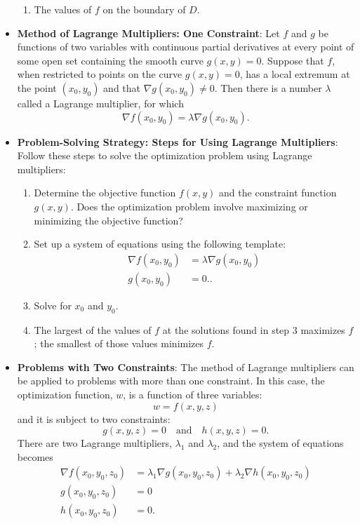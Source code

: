\documentclass{report}
\begin{document}
\begin{itemize}
\begin{enumerate}
            \item The values of $f$ on the boundary of $D$.
        \end{enumerate}
    \item \textbf{Method of Lagrange Multipliers: One Constraint}:
        Let $f$ and $g$ be functions of two variables with continuous partial derivatives at every point of some open set containing the smooth curve $g(x,y)=0$. Suppose that $f$, when restricted to points on the curve $g(x,y)=0$, has a local extremum at the point $(x_0,y_0)$ and that $\nabla g(x_0,y_0) \neq 0$. Then there is a number $\lambda$ called a Lagrange multiplier, for which
        \[
            \nabla f(x_0,y_0) = \lambda \nabla g(x_0,y_0).
        \]
    \item \textbf{Problem-Solving Strategy: Steps for Using Lagrange Multipliers}:
        Follow these steps to solve the optimization problem using Lagrange multipliers:
        \begin{enumerate}
            \item Determine the objective function $f(x,y)$ and the constraint function $g(x,y)$. Does the optimization problem involve maximizing or minimizing the objective function?
            \item Set up a system of equations using the following template:
                \begin{align*}
                    \nabla f(x_0,y_0) &= \lambda \nabla g(x_0,y_0)  \\
                    g(x_0,y_0) &= 0.
                .\end{align*}
            \item Solve for $x_0$ and $y_0$.
            \item The largest of the values of $f$ at the solutions found in step 3 maximizes $f$; the smallest of those values minimizes $f$.
        \end{enumerate}
    \item \textbf{Problems with Two Constraints}:
        The method of Lagrange multipliers can be applied to problems with more than one constraint. In this case, the optimization function, $w$, is a function of three variables:
        \[
            w = f(x, y, z)
        \]
        and it is subject to two constraints:
        \[
            g(x, y, z) = 0 \quad \text{and} \quad h(x, y, z) = 0.
        \]
        There are two Lagrange multipliers, $\lambda_1$ and $\lambda_2$, and the system of equations becomes
        \begin{align*}
            \nabla f(x_0, y_0, z_0) &= \lambda_1 \nabla g(x_0, y_0, z_0) + \lambda_2 \nabla h(x_0, y_0, z_0) \\
            g(x_0, y_0, z_0) &= 0 \\
            h(x_0, y_0, z_0) &= 0
        .\end{align*}
    \end{itemize}
\end{document}
